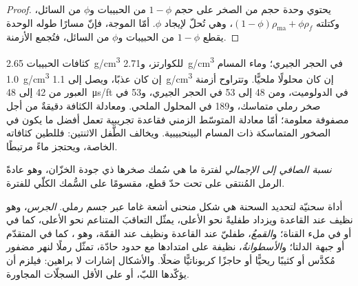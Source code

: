\begin{proof}
يحتوي وحدة حجم من الصخر على حجم $1 - \phi$ من الحبيبات و$\phi$ من
السائل، وكتلته $(1 - \phi)\rho_{\mathrm{ma}} + \phi\rho_f$، وهي
تُحلّ لإيجاد $\phi$. أمّا الموجة، فإنّ مسارًا طوله الوحدة يقطع $1 - \phi$ من
الحبيبات و$\phi$ من السائل، فتُجمع الأزمنة.
\end{proof}

كثافات الحبيبات \qty{2.65}{g/cm^3} للكوارتز، و\qty{2.71}{g/cm^3} في
الحجر الجيري؛ وماء المسام \qty{1.0}{g/cm^3} إن كان عذبًا، ويصل إلى
\qty{1.1}{g/cm^3} إن كان محلولًا ملحيًّا. وتتراوح أزمنة العبور من 42 إلى
\qty{48}{\micro\second/ft} في الدولوميت، ومن 48 إلى 53 في الحجر الجيري، و53 في
صخر رملي متماسك، و189 في المحلول الملحي. ومعادلة الكثافة دقيقةٌ من أجل
مصفوفة معلومة؛ أمّا معادلة المتوسّط الزمني فقاعدة تجريبية تعمل
أفضل ما يكون في الصخور المتماسكة ذات المسام البينحبيبية. ويخالف الطَّفل الاثنتين:
فللطين كثافاته الخاصة، ويحتجز ماءً مرتبطًا.

\begin{definition}\label{def:b3:facies-models:ntg}
\emph{نسبة الصافي إلى الإجمالي} لفترة ما هي
سُمك صخرها ذي جودة الخزّان، وهو عادةً الرمل المُنتقى على 
تحت حدّ قطع، مقسومًا على السُّمك الكلّي للفترة.
\end{definition}

أداة سحنيّة لتحديد السحنة هي شكل منحنى أشعة غاما عبر جسم رملي.
\emph{الجرس}، وهو نظيف عند القاعدة ويزداد طفليةً نحو الأعلى، يمثّل
التعاقبَ المتناعم نحو الأعلى، كما في  أو في ملء القناة؛ و\emph{القمعُ}، طفليّ عند
القاعدة ونظيف عند القمّة، وهو ، كما في
 المتقدّم أو جبهة الدلتا؛ و\emph{الأسطوانةُ}، نظيفة على امتدادها مع
حدود حادّة، تمثّل رملًا لنهر مضفور مُكدَّس أو كثيبًا ريحيًّا أو
حاجزًا كربوناتيًّا ضحلًا. والأشكال إشارات لا براهين: فيلزم أن يؤكّدها اللبّ،
أو على الأقل السجلّات المجاورة.

